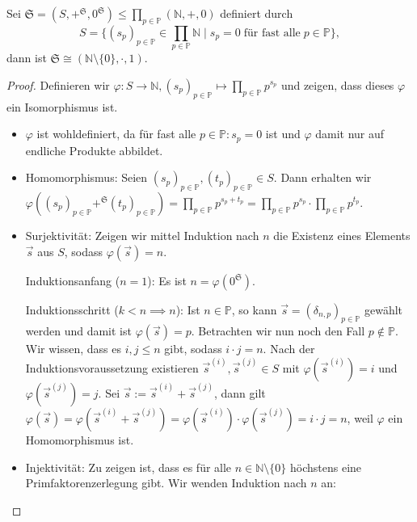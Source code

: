 \begin{theorem}\label{theorem:fundamentalsatz-der-arithmetik}
    Sei $\mathfrak{S} = (S, +^{\mathfrak{S}}, 0^{\mathfrak{S}}) \le \prod_{p \in \mathbb{P}} (\mathbb{N}, +, 0)$ definiert durch
    $$ S = \{(s_p)_{p \in \mathbb{P}} \in \prod_{p \in \mathbb{P}} \mathbb{N} \mid s_p = 0 \;\text{für fast alle}\; p \in \mathbb{P}\}, $$
    dann ist $\mathfrak{S} \cong (\mathbb{N}\setminus\{0\}, \cdot, 1)$.
\end{theorem}

\begin{proof} Definieren wir $\varphi: S \to \mathbb{N}, (s_p)_{p \in \mathbb{P}} \mapsto \prod_{p \in \mathbb{P}} p^{s_p}$ und zeigen, dass dieses $\varphi$ ein Isomorphismus ist.
    \begin{itemize}[topsep=0cm, label={--}]
        \item $\varphi$ ist wohldefiniert, da für fast alle $p \in \mathbb{P}: s_p = 0$ ist und $\varphi$ damit nur auf endliche Produkte abbildet.
        
        \item Homomorphismus: Seien $(s_p)_{p \in \mathbb{P}}, (t_p)_{p \in \mathbb{P}} \in S$. Dann erhalten wir $\varphi((s_p)_{p \in \mathbb{P}} +^\mathfrak{S} (t_p)_{p \in \mathbb{P}}) = \prod_{p \in \mathbb{P}} p^{s_p + t_p} = \prod_{p \in \mathbb{P}} p^{s_p} \cdot \prod_{p \in \mathbb{P}} p^{t_p}$.
        
        \item Surjektivität: Zeigen wir mittel Induktion nach $n$ die Existenz eines Elements $\vec{s}$ aus $S$, sodass $\varphi(\vec{s}) = n$.
        
        Induktionsanfang ($n=1$): Es ist $n = \varphi(0^\mathfrak{S})$.

        Induktionsschritt ($k<n \implies n$): Ist $n \in \mathbb{P}$, so kann $\vec{s} = (\delta_{n,p})_{p \in \mathbb{P}}$ gewählt werden und damit ist $\varphi(\vec{s}) = p$. Betrachten wir nun noch den Fall $p \not\in \mathbb{P}$. Wir wissen, dass es $i, j \le n$ gibt, sodass $i \cdot j = n$. Nach der Induktionsvoraussetzung existieren $\vec s^{(i)}, \vec s^{(j)} \in S$ mit $\varphi(\vec s^{(i)}) = i$ und $\varphi(\vec s^{(j)}) = j$. Sei $\vec s := \vec s^{(i)} + \vec s^{(j)}$, dann gilt $\varphi(\vec s) = \varphi(\vec s^{(i)} + \vec s^{(j)}) = \varphi(\vec s^{(i)}) \cdot \varphi(\vec s^{(j)}) = i \cdot j = n$, weil $\varphi$ ein Homomorphismus ist.

        \item Injektivität: Zu zeigen ist, dass es für alle $n \in \mathbb{N} \setminus \{0\}$ höchstens eine Primfaktorenzerlegung gibt. Wir wenden Induktion nach $n$ an:
        

\end{itemize}
\end{proof}
